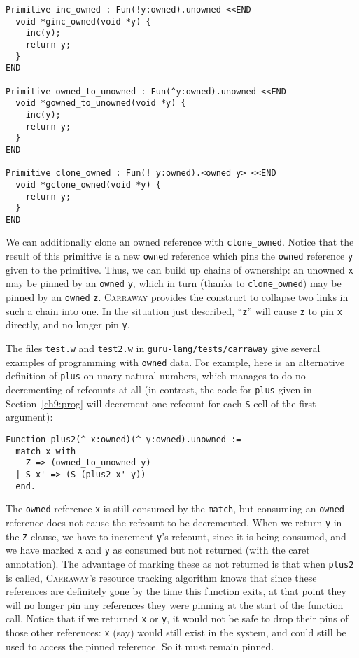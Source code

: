 \documentclass{book}[12pt]
\newcommand{\carraway}[0]{\textsc{Carraway}\xspace}
\begin{document}
\begin{verbatim}
Primitive inc_owned : Fun(!y:owned).unowned <<END
  void *ginc_owned(void *y) {
    inc(y);
    return y;
  }
END

Primitive owned_to_unowned : Fun(^y:owned).unowned <<END
  void *gowned_to_unowned(void *y) {
    inc(y);
    return y;
  }
END

Primitive clone_owned : Fun(! y:owned).<owned y> <<END
  void *gclone_owned(void *y) {
    return y;
  }
END
\end{verbatim}

\noindent 
We can additionally clone an owned reference with
\texttt{clone\_owned}.  Notice that the result of this primitive is a
new \texttt{owned} reference which pins the \texttt{owned} reference
\texttt{y} given to the primitive.  Thus, we can build up chains of
ownership: an unowned \texttt{x} may be pinned by an \texttt{owned}
\texttt{y}, which in turn (thanks to \texttt{clone\_owned}) may be
pinned by an \texttt{owned} \texttt{z}.  \carraway provides the \@
construct to collapse two links in such a chain into one.  In the
situation just described, ``\@ \texttt{z}'' will cause \texttt{z} to
pin \texttt{x} directly, and no longer pin \texttt{y}.

The files \texttt{test.w} and \texttt{test2.w} in
\texttt{guru-lang/tests/carraway} give several examples of programming
with \texttt{owned} data.  For example, here is an alternative
definition of \texttt{plus} on unary natural numbers, which manages to
do no decrementing of refcounts at all (in contrast, the code for
\texttt{plus} given in Section~\ref{ch9:prog} will decrement one
refcount for each \texttt{S}-cell of the first argument):

\begin{verbatim}
Function plus2(^ x:owned)(^ y:owned).unowned :=
  match x with
    Z => (owned_to_unowned y)
  | S x' => (S (plus2 x' y))
  end.
\end{verbatim}

\noindent The \texttt{owned} reference \texttt{x} is still consumed by
the \texttt{match}, but consuming an \texttt{owned} reference does not
cause the refcount to be decremented.  When we return \texttt{y} in
the \texttt{Z}-clause, we have to increment \texttt{y}'s refcount,
since it is being consumed, and we have marked \texttt{x} and
\texttt{y} as consumed but not returned (with the caret annotation).
The advantage of marking these as not returned is that when
\texttt{plus2} is called, \carraway's resource tracking algorithm
knows that since these references are definitely gone by the time this
function exits, at that point they will no longer pin any references
they were pinning at the start of the function call.  Notice that if
we returned \texttt{x} or \texttt{y}, it would not be safe to drop
their pins of those other references: \texttt{x} (say) would still
exist in the system, and could still be used to access the pinned
reference.  So it must remain pinned.
\end{document}
